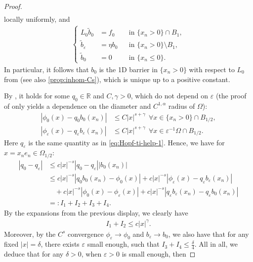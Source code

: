 \documentclass[11pt,reqno]{amsart}
\theoremstyle{plain}
\theoremstyle{definition}
\numberwithin{equation}{section}
\newcommand{\R}{\mathbb{R}}
\newcommand{\eps}{\varepsilon}
\newcommand{\1}{\mathbbm{1}}
\begin{document}
\begin{proof}
\begin{align*}
\end{align*}
locally uniformly, and
\begin{align*}
\left\{
\begin{aligned}
        L_{0} \tilde{b}_{0} &= f_{0} &&\text{in } \{ x_n > 0 \} \cap B_1,\\
        \tilde{b}_{\eps} &= \eta b_{0} &&\text{in } \{ x_n > 0 \} \setminus B_1,\\
        \tilde{b}_{0} &= 0 &&\text{in } \{ x_n \le 0 \}.
\end{aligned}
\right.
\end{align*}
In particular, it follows that $b_0$ is the 1D barrier in $\{ x_n > 0 \}$ with respect to $L_0$ from \cite{RoWe24} (see also \autoref{prop:inhom-Cs}), which is unique up to a positive constant.

By \cite[Theorem 6.9]{RoWe24}, it holds for some $q_0 \in \R$ and $C,\gamma > 0$, which do not depend on $\eps$ (the proof of \cite[Theorem 6.9]{RoWe24} only yields a dependence on the diameter and $C^{1,\alpha}$ radius of $\Omega$):
\begin{align*}
    |\phi_0(x) - q_{0} b_0 (x_n)| &\le C |x|^{s+\gamma} ~~ \forall x \in \{ x_n > 0 \} \cap B_{1/2}, \\
        |\phi_{\eps}(x) - q_{\eps} b_{\eps} (x_n)| &\le C |x|^{s+\gamma} ~~ \forall x \in \eps^{-1} \Omega \cap B_{1/2}.
\end{align*}
Here $q_{\eps}$ is the same quantity as in \eqref{eq:Hopf-ti-help-1}. Hence, we have for $x = x_n e_n \in \Omega_{1/2}$:
\begin{align*}
    |q_0 - q_{\eps}|
    &\le c |x|^{-s} |q_0-q_\varepsilon| |b_0(x_n)| \\
    &\le c |x|^{-s} |q_0 b_0(x_n) - \phi_0(x)| + c |x|^{-s} |\phi_{\eps}(x) - q_\varepsilon b_{\eps}(x_n)| \\
    &\quad + c |x|^{-s}  |\phi_0(x) - \phi_{\eps}(x)|+ c |x|^{-s} |q_\varepsilon b_{\eps}(x_n) - q_\varepsilon b_{0}(x_n)| \\
    &=: I_1 + I_2 + I_3 + I_4.
\end{align*}
By the expansions from the previous display, we clearly have
\begin{align*}
    I_1 + I_2 \le c |x|^{\gamma}.
\end{align*}
Moreover, by the $C^s$ convergence $\phi_{\eps} \to \phi_0$ and $b_{\eps} \to b_0$, we also have that for any fixed $|x| = \delta$, there exists $\eps$ small enough, such that $I_3 + I_4 \le \frac{\delta}{4}$. All in all, we deduce that for any $\delta > 0$, when $\eps > 0$ is small enough, then

\end{proof}
\end{document}
